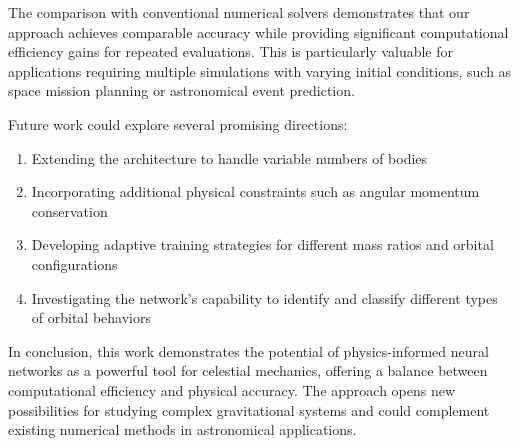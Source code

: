 \documentclass[draft]{agujournal2019}
\begin{document}
The comparison with conventional numerical solvers demonstrates that our approach achieves comparable accuracy while providing significant computational efficiency gains for repeated evaluations. This is particularly valuable for applications requiring multiple simulations with varying initial conditions, such as space mission planning or astronomical event prediction.

Future work could explore several promising directions:
\begin{enumerate}
    \item Extending the architecture to handle variable numbers of bodies
    \item Incorporating additional physical constraints such as angular momentum conservation
    \item Developing adaptive training strategies for different mass ratios and orbital configurations
    \item Investigating the network's capability to identify and classify different types of orbital behaviors
\end{enumerate}

In conclusion, this work demonstrates the potential of physics-informed neural networks as a powerful tool for celestial mechanics, offering a balance between computational efficiency and physical accuracy. The approach opens new possibilities for studying complex gravitational systems and could complement existing numerical methods in astronomical applications.




\end{document}
